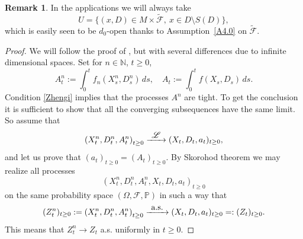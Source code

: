 \documentclass[JEP,XML,SOM,Unicode,NoFloatCountersInSection,published]{cedram}
\let\backslash\setminus
\newcommand\To[1]{\mathchoice{\xrightarrow{\textstyle\kern4pt#1\kern3pt}}{\stackrel{#1}{\longrightarrow}}{}{}}
\theoremstyle{plain}
\theoremstyle{definition}
\newtheorem{remark}[thm]{Remark}
\newcommand{\NN}{{\mathbb N}}
\newcommand{\PP}{{\mathbb P}}
\newcommand{\SF}{{\mathscr F}}
\newcommand{\SL}{{\mathscr L}}
\let\di\displaystyle
\let\Om\Omega
\begin{document}
\begin{remark}
\label{HR1}
In the applications we will always take\vspace*{-3pt}
\begin{equation}
\label{H3}
U=\bigl\{(x,D)\in M\times \tilde\SF, \ x\in D\backslash S(D)\bigr\},
\end{equation}
which is easily seen to be $d_0$-open thanks to Assumption~\ref{A4.0} on $\tilde\SF$.
\end{remark}
\begin{proof}
We will follow the proof of \cite[Lem.\,4]{Zheng:85}, but with several differences due to infinite dimensional spaces. Set for $n\in \NN$, $t\ge 0$,\vspace*{-3pt}
\begin{equation}
\label{H4}
A_t^n:=\int_0^tf_n(X_s^n, D_s^n)\, ds, \quad A_t:=\int_0^tf(X_s, D_s)\, ds.
\end{equation}
Condition \eqref{Zhengi} implies that the processes $A^n$ are tight.
To get the conclusion it is sufficient to show that all the converging subsequences have the same limit. So assume that\vspace*{-3pt}
\begin{equation}
\left( X_t^n, D_t^n, A_t^n\right)_{t\ge 0} \To{\SL}( X_t, D_t, a_t)_{t\ge 0},
\end{equation}
and let us prove that $\di( a_t)_{t\ge 0}= \left( A_t\right)_{t\ge 0}$.
By Skorohod theorem we may realize all processes\vspace*{-3pt}
\begin{equation}
\left( X_t^n, D_t^n, A_t^n, X_t, D_t, a_t\right)_{t\ge 0}
\end{equation}
on the same probability space $(\Om,\SF, \PP)$ in such a way that
\begin{equation}
\label{H7}
(Z_t^n)_{t\ge 0}:=\left( X_t^n, D_t^n, A_t^n\right)_{t\ge 0} \To{\text{a.s.}}( X_t, D_t, a_t)_{t\ge 0}=:(Z_t)_{t\ge 0}.
\end{equation}
This means that $Z_t^n\to Z_t$ a.s. uniformly in $t\ge 0$.


\end{proof}
\end{document}
